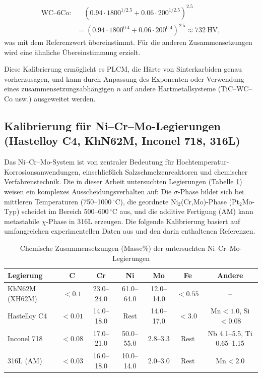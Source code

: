 \documentclass[12pt,a4paper]{article}
\begin{document}
	\[
	\begin{aligned}
		\text{WC–6Co:}&\quad (0.94\cdot1800^{1/2.5} + 0.06\cdot200^{1/2.5})^{2.5} \\
		&= (0.94\cdot1800^{0.4} + 0.06\cdot200^{0.4})^{2.5} \approx 732\ \text{HV},
	\end{aligned}
	\]
	was mit dem Referenzwert übereinstimmt. Für die anderen Zusammensetzungen wird eine ähnliche Übereinstimmung erzielt.
	
	Diese Kalibrierung ermöglicht es PLCM, die Härte von Sinterkarbiden genau vorherzusagen, und kann durch Anpassung des Exponenten oder Verwendung eines zusammensetzungsabhängigen $n$ auf andere Hartmetallsysteme (TiC–WC–Co usw.) ausgeweitet werden.
	
	
	\subsection{Kalibrierung für Ni–Cr–Mo-Legierungen (Hastelloy C4, KhN62M, Inconel 718, 316L)}
	\label{subsec:calibration_nicrmo}
	
	Das Ni–Cr–Mo-System ist von zentraler Bedeutung für Hochtemperatur-Korrosionsanwendungen, einschließlich Salzschmelzenreaktoren und chemischer Verfahrenstechnik. Die in dieser Arbeit untersuchten Legierungen (Tabelle \ref{tab:nicrmo_compositions}) weisen ein komplexes Ausscheidungsverhalten auf: Die $\sigma$-Phase bildet sich bei mittleren Temperaturen (750–1000\,\(^{\circ}\)C), die geordnete Ni$_2$(Cr,Mo)-Phase (Pt$_2$Mo-Typ) scheidet im Bereich 500–600\,\(^{\circ}\)C aus, und die additive Fertigung (AM) kann metastabile $\chi$-Phase in 316L erzeugen. Die folgende Kalibrierung basiert auf umfangreichen experimentellen Daten aus \cite{dis2025} und den darin enthaltenen Referenzen.
	
	\begin{table}[htbp]
		\centering
		\caption{Chemische Zusammensetzungen (Masse\%) der untersuchten Ni–Cr–Mo-Legierungen}
		\label{tab:nicrmo_compositions}
		\begin{tabular}{lcccccc}
			\toprule
			\textbf{Legierung} & \textbf{C} & \textbf{Cr} & \textbf{Ni} & \textbf{Mo} & \textbf{Fe} & \textbf{Andere} \\
			\midrule
			KhN62M (XH62M) & \(<0.1\) & 23.0–24.0 & 61.0–64.0 & 12.0–14.0 & \(<0.55\) & – \\
			Hastelloy C4   & \(<0.01\) & 14.0–18.0 & Rest & 14.0–17.0 & \(<3.0\) & Mn\(<1.0\), Si\(<0.08\) \\
			Inconel 718    & \(<0.08\) & 17.0–21.0 & 50.0–55.0 & 2.8–3.3 & Rest & Nb 4.1–5.5, Ti 0.65–1.15 \\
			316L (AM)      & \(<0.03\) & 16.0–18.0 & 10.0–14.0 & 2.0–3.0 & Rest & Mn\(<2.0\) \\
			\bottomrule
		\end{tabular}
	\end{table}
	
\end{document}
